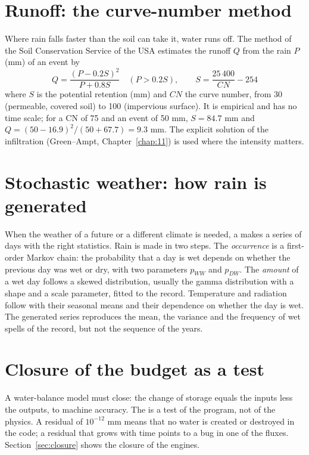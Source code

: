 \section{Runoff: the curve-number method}
Where rain falls faster than the soil can take it, water runs off. The method of the Soil Conservation Service of the USA estimates the runoff $Q$ from the rain $P$ (mm) of an event by
\begin{equation*}\boxed{Q=\frac{(P-0.2S)^2}{P+0.8S}\quad(P>0.2S),\qquad S=\frac{25\,400}{CN}-254}\end{equation*}
where $S$ is the potential retention (mm) and $CN$ the curve number, from 30 (permeable, covered soil) to 100 (impervious surface). It is empirical and has no time scale; for a CN of 75 and an event of 50 mm, $S=84.7$ mm and $Q=(50-16.9)^2/(50+67.7)=9.3$ mm. The explicit solution of the infiltration (Green--Ampt, Chapter~\ref{chap:11}) is used where the intensity matters.

\section{Stochastic weather: how rain is generated}
When the weather of a future or a different climate is needed, a  makes a series of days with the right statistics. Rain is made in two steps. The \emph{occurrence} is a first-order Markov chain: the probability that a day is wet depends on whether the previous day was wet or dry, with two parameters $p_{WW}$ and $p_{DW}$. The \emph{amount} of a wet day follows a skewed distribution, usually the gamma distribution with a shape and a scale parameter, fitted to the record. Temperature and radiation follow with their seasonal means and their dependence on whether the day is wet. The generated series reproduces the mean, the variance and the frequency of wet spells of the record, but not the sequence of the years.

\section{Closure of the budget as a test}
A water-balance model must close: the change of storage equals the inputs less the outputs, to machine accuracy. The  is a test of the program, not of the physics. A residual of $10^{-12}$ mm means that no water is created or destroyed in the code; a residual that grows with time points to a bug in one of the fluxes. Section~\ref{sec:closure} shows the closure of the engines.
